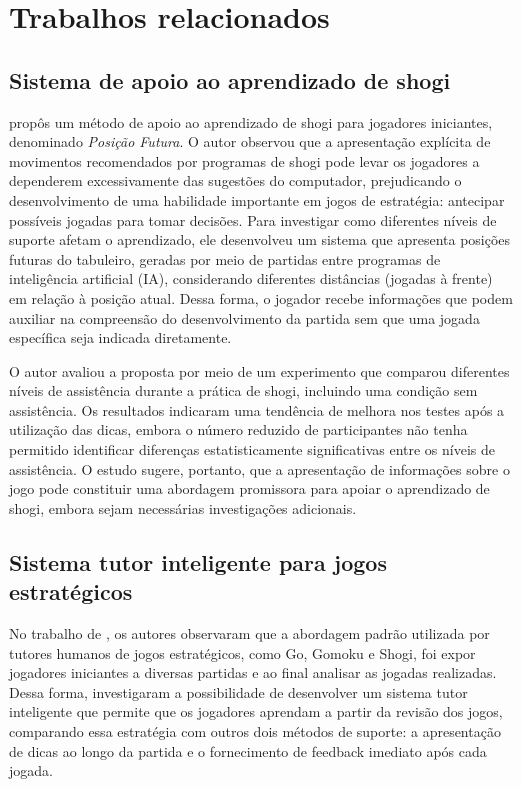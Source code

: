 
\chapter{Trabalhos relacionados}
\label{cap:trabalhos-relacionados}

\section{Sistema de apoio ao aprendizado de shogi}
\cite{future-position} propôs um método de apoio ao aprendizado de shogi para jogadores iniciantes, 
denominado \textit{Posição Futura}. O autor observou que a apresentação explícita de movimentos recomendados por programas de shogi 
pode levar os jogadores a dependerem excessivamente das sugestões do computador, prejudicando o desenvolvimento de uma habilidade 
importante em jogos de estratégia: antecipar possíveis jogadas para tomar decisões. Para investigar como diferentes níveis de suporte 
afetam o aprendizado, ele desenvolveu um sistema que apresenta posições futuras do tabuleiro, geradas por meio de partidas entre programas 
de inteligência artificial (IA), considerando diferentes distâncias (jogadas à frente) em relação à posição atual. Dessa forma, o jogador 
recebe informações que podem auxiliar na compreensão do desenvolvimento da partida sem que uma jogada específica seja indicada diretamente.

O autor avaliou a proposta por meio de um experimento que comparou diferentes níveis de assistência durante a prática de shogi, incluindo 
uma condição sem assistência. Os resultados indicaram uma tendência de melhora nos testes após a utilização das dicas, embora o número 
reduzido de participantes não tenha permitido identificar diferenças estatisticamente significativas entre os níveis de assistência. O estudo 
sugere, portanto, que a apresentação de informações sobre o jogo pode constituir uma abordagem promissora para apoiar o aprendizado de shogi, 
embora sejam necessárias investigações adicionais. 

\section{Sistema tutor inteligente para jogos estratégicos}
No trabalho de \cite{AI-gomoku-tutor}, os autores observaram que a abordagem padrão utilizada 
por tutores humanos de jogos estratégicos, como Go, Gomoku e Shogi, foi expor jogadores iniciantes a diversas partidas e ao final analisar as 
jogadas realizadas. Dessa forma, investigaram a possibilidade de desenvolver um sistema tutor inteligente que permite que os jogadores 
aprendam a partir da revisão dos jogos, comparando essa estratégia com outros dois métodos de suporte: a apresentação de dicas ao longo da 
partida e o fornecimento de feedback imediato após cada jogada. 

